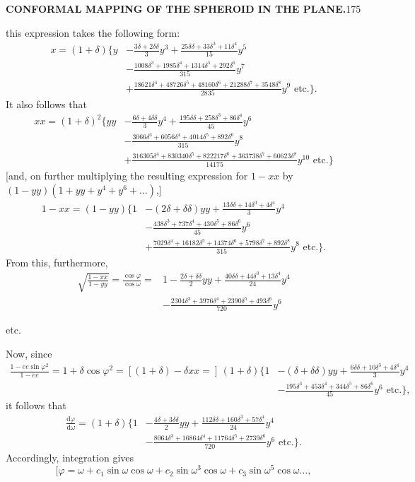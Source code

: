 \par\clearpage
\noindent\null\hfill{\small\textbf{CONFORMAL MAPPING OF THE SPHEROID IN THE PLANE.}}\hfill175\par\medskip
\noindent this expression takes the following form:
\[
\begin{aligned}
x=(1+\delta)\biggl\{y&-\frac{3\delta+2\delta\delta}{3}y^3+\frac{25\delta\delta+33\delta^3+11\delta^4}{15}y^5\\
&-\frac{1008\delta^3+1985\delta^4+1314\delta^5+292\delta^6}{315}y^7\\
&+\frac{18621\delta^4+48726\delta^5+48160\delta^6+21288\delta^7+3548\delta^8}{2835}y^9\text{ etc.}\biggr\}.
\end{aligned}
\]
It also follows that
\[
\begin{aligned}
xx=(1+\delta)^2\biggl\{yy&-\frac{6\delta+4\delta\delta}{3}y^4+\frac{195\delta\delta+258\delta^3+86\delta^4}{45}y^6\\
&-\frac{3066\delta^3+6056\delta^4+4014\delta^5+892\delta^6}{315}y^8\\
&+\frac{316305\delta^4+830340\delta^5+822217\delta^6+363738\delta^7+60623\delta^8}{14175}y^{10}\text{ etc.}\biggr\}
\end{aligned}
\]
[and, on further multiplying the resulting expression for \(1-xx\) by \((1-yy)(1+yy+y^4+y^6+\ldots)\),]
\[
\begin{aligned}
1-xx=(1-yy)\biggl\{1&-(2\delta+\delta\delta)yy+\frac{13\delta\delta+14\delta^3+4\delta^4}{3}y^4\\
&-\frac{438\delta^3+737\delta^4+430\delta^5+86\delta^6}{45}y^6\\
&+\frac{7029\delta^4+16182\delta^5+14374\delta^6+5798\delta^7+892\delta^8}{315}y^8\text{ etc.}\biggr\}.
\end{aligned}
\]
From this, furthermore,
\[
\begin{aligned}
\sqrt{\frac{1-xx}{1-yy}}=\frac{\cos\varphi}{\cos\omega}={}&1-\frac{2\delta+\delta\delta}{2}yy+\frac{40\delta\delta+44\delta^3+13\delta^4}{24}y^4\\
&-\frac{2304\delta^3+3976\delta^4+2390\delta^5+493\delta^6}{720}y^6
\end{aligned}
\]
{\centering etc.\par}
Now, since
\[
\begin{aligned}
\frac{1-ee\sin\varphi^2}{1-ee}=1+\delta\cos\varphi^2=[(1+\delta)-\delta xx={}]\,(1+\delta)\biggl\{1&-(\delta+\delta\delta)yy+\frac{6\delta\delta+10\delta^3+4\delta^4}{3}y^4\\
&-\frac{195\delta^3+453\delta^4+344\delta^5+86\delta^6}{45}y^6\text{ etc.}\biggr\},
\end{aligned}
\]
\noindent it follows that
\[
\begin{aligned}
\frac{\mathrm d\varphi}{\mathrm d\omega}=(1+\delta)\biggl\{1&-\frac{4\delta+3\delta\delta}{2}yy+\frac{112\delta\delta+160\delta^3+57\delta^4}{24}y^4\\
&-\frac{8064\delta^3+16864\delta^4+11764\delta^5+2739\delta^6}{720}y^6\text{ etc.}\biggr\}.
\end{aligned}
\]
Accordingly, integration gives
\[ [\varphi=\omega+c_1\sin\omega\cos\omega+c_2\sin\omega^3\cos\omega+c_3\sin\omega^5\cos\omega\ldots,\]

